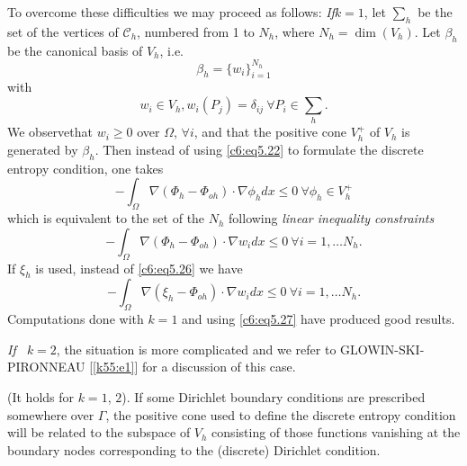To overcome these difficulties we may proceed as follows: 
\textit{If}$k=1$, let $\sum_h$ be the set of the vertices of $\mathscr{C}_h$, 
numbered from 1 to $N_h$, where $N_h = \dim(V_h)$. Let $\beta_h$ be the 
canonical basis of $V_h$, i.e.     
\begin{equation}
\beta_h = \{w_i\}^{N_h}_{i=1} \tag{5.23}\label{c6:eq5.23} 
\end{equation}
with 
\begin{equation}
w_i \in V_h, w_i (P_j) = \delta_{ij} ~ \forall P_i \in 
\sum_h. \tag{5.24}\label{c6:eq5.24} 
\end{equation}
We observe\pageoriginale  that $w_i \geq 0$ over $\Omega$, $\forall i$, and that the 
positive cone $V^+_h $ of $V_h$ is generated by $\beta_h$. Then instead 
of using \eqref{c6:eq5.22} to formulate the discrete entropy condition, 
one takes    
\begin{equation}
-\int_\Omega \nabla (\Phi_h - \Phi_{oh}) \cdot \nabla 
\phi_h dx \leq 0 ~ \forall \phi_h \in V^+_h 
\tag{5.25}\label{c6:eq5.25}  
\end{equation}
which is equivalent to the set of the $N_h$ following \textit{linear 
inequality constraints} 
\begin{equation}
-\int_\Omega \nabla (\Phi_h - \Phi_{oh}) \cdot \nabla w_i 
dx \leq 0 ~ \forall i=1, \ldots N_h .\tag{5.26}\label{c6:eq5.26} 
\end{equation}
If $\xi_h$ is used, instead of \eqref{c6:eq5.26} we have 
\begin{equation}
-\int_\Omega \nabla (\xi_h - \Phi_{oh}) \cdot \nabla w_i 
dx \leq 0 ~ \forall i=1, \ldots  N_h .\tag{5.27}\label{c6:eq5.27}  
\end{equation}
Computations done with $k=1$ and using \eqref{c6:eq5.27} have produced 
good results.  

\textit{If~ $k=2$}, the situation is more complicated and we refer to 
GLOWI\-N-SKI-PIRONNEAU [\ref{k55:e1}]  for a discussion of this case.  

\begin{remark}\label{c6:rem5.8}%
(It holds for $k=1$, $2$). If some Dirichlet boundary conditions are  
prescribed somewhere over $\Gamma$, the positive cone used to define 
the discrete entropy condition will be related to the subspace of $V_h$ 
consisting of those functions vanishing at the boundary nodes 
corresponding to the (discrete) Dirichlet condition.     
\end{remark}

